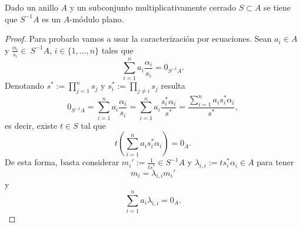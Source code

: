 \documentclass[../main.tex]{subfiles}
\begin{document}
	\begin{proposition}
		Dado un anillo $A$ y un subconjunto multiplicativamente cerrado $S\subset A$ se tiene que $S^{-1}A$ es un $A$-módulo plano.
	\end{proposition}

	\begin{proof}
		Para probarlo vamos a usar la caracterización por ecuaciones. Sean $a_i\in A$ y $\frac{\alpha_i}{s_i}\in\ S^{-1}A$, $i\in\{1,\dots,n\}$ tales que
		$$\sum_{i=1}^na_i\frac{\alpha_i}{s_i}=0_{S^{-1}A}.$$
		Denotando $s^*:=\prod_{j=1}^ns_j$ y $s_i^*:=\prod_{j\neq i}s_j$ resulta
		$$0_{S^{-1}A}=\sum_{i=1}^na_i\frac{\alpha_i}{s_i}=\sum_{i=1}^na_i\frac{s_i^*\alpha_i}{s^*}=\frac{\sum_{i=1}^na_is_i^*\alpha_i}{s^*},$$
		es decir, existe $t\in S$ tal que
		$$t(\sum_{i=1}^na_is_i^*\alpha_i)=0_A.$$
		De esta forma, basta considerar $m_i':=\frac{1}{ts^*}\in S^{-1}A$ y $\lambda_{i,i}:=ts_i^*\alpha_i\in A$ para tener
		$$m_i=\lambda_{i,i}m_i'$$
		y
		$$\sum_{i=1}^na_i\lambda_{i,i}=0_A.$$
	\end{proof}
\end{document}
